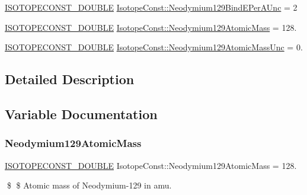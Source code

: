 \begin{DoxyCompactItemize}
\mbox{\hyperlink{group___isotope_const-_macros_ga8f45a7272ce02c0b4c65c44636ed719a}{I\+S\+O\+T\+O\+P\+E\+C\+O\+N\+S\+T\+\_\+\+D\+O\+U\+B\+LE}} \mbox{\hyperlink{group___isotope_const-_neodymium-_nd129_ga875c6a6b3861ee80a358e92c3b99d47c}{Isotope\+Const\+::\+Neodymium129\+Bind\+E\+Per\+A\+Unc}} = 2
\item 
\mbox{\hyperlink{group___isotope_const-_macros_ga8f45a7272ce02c0b4c65c44636ed719a}{I\+S\+O\+T\+O\+P\+E\+C\+O\+N\+S\+T\+\_\+\+D\+O\+U\+B\+LE}} \mbox{\hyperlink{group___isotope_const-_neodymium-_nd129_ga1706013d08aa3741cb20c53ed37949d3}{Isotope\+Const\+::\+Neodymium129\+Atomic\+Mass}} = 128.
\item 
\mbox{\hyperlink{group___isotope_const-_macros_ga8f45a7272ce02c0b4c65c44636ed719a}{I\+S\+O\+T\+O\+P\+E\+C\+O\+N\+S\+T\+\_\+\+D\+O\+U\+B\+LE}} \mbox{\hyperlink{group___isotope_const-_neodymium-_nd129_gaf7cb3d22d6a4c18644094c0945846977}{Isotope\+Const\+::\+Neodymium129\+Atomic\+Mass\+Unc}} = 0.
\end{DoxyCompactItemize}


\subsection{Detailed Description}


\subsection{Variable Documentation}
\mbox{\label{group___isotope_const-_neodymium-_nd129_ga1706013d08aa3741cb20c53ed37949d3}} 
\subsubsection{\texorpdfstring{Neodymium129\+Atomic\+Mass}{Neodymium129AtomicMass}}
{\footnotesize\ttfamily \mbox{\hyperlink{group___isotope_const-_macros_ga8f45a7272ce02c0b4c65c44636ed719a}{I\+S\+O\+T\+O\+P\+E\+C\+O\+N\+S\+T\+\_\+\+D\+O\+U\+B\+LE}} Isotope\+Const\+::\+Neodymium129\+Atomic\+Mass = 128.}

\$ \$ Atomic mass of Neodymium-\/129 in amu. \mbox{\label{group___isotope_const-_neodymium-_nd129_gaf7cb3d22d6a4c18644094c0945846977}} 
